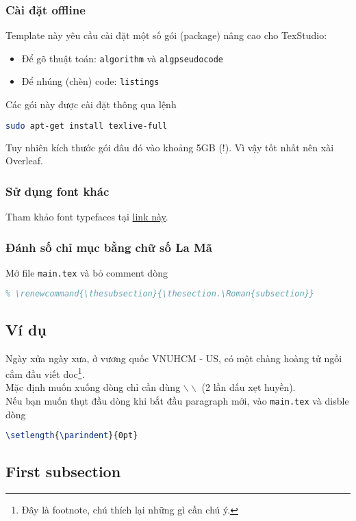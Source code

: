 \subsubsection{Cài đặt offline}
Template này yêu cầu cài đặt một số gói (package) nâng cao cho TexStudio:
\begin{itemize}
\item Để gõ thuật toán: \texttt{algorithm} và \texttt{algpseudocode}
\item Để nhúng (chèn) code: \texttt{listings}
\end{itemize}
Các gói này được cài đặt thông qua lệnh
\begin{lstlisting}[language=sh]
sudo apt-get install texlive-full
\end{lstlisting}
Tuy nhiên kích thước gói đâu đó vào khoảng 5GB (!). Vì vậy tốt nhất nên xài Overleaf.

\subsubsection{Sử dụng font khác}
Tham khảo font typefaces tại \href{https://www.overleaf.com/learn/latex/Font_typefaces}{link này}.

\subsubsection{Đánh số chỉ mục bằng chữ số La Mã}
Mở file \texttt{main.tex} và bỏ comment dòng 
\begin{lstlisting}[language=tex]
% \renewcommand{\thesection}{\Roman{section}}
% \renewcommand{\thesubsection}{\thesection.\Roman{subsection}}  
\end{lstlisting}

\subsection{Ví dụ}
Ngày xửa ngày xưa, ở vương quốc VNUHCM - US, có một chàng hoàng tử ngồi cắm đầu viết doc\footnote{Đây là footnote, chú thích lại những gì cần chú ý.}.\\
Mặc định muốn xuống dòng chỉ cần dùng $\backslash\backslash$  (2 lần dấu xẹt huyền).\\
Nếu bạn muốn thụt đầu dòng khi bắt đầu paragraph mới, vào \texttt{main.tex} và disble dòng
\begin{lstlisting}[language=tex]
\setlength{\parindent}{0pt}
\end{lstlisting}

\subsection{First subsection}
